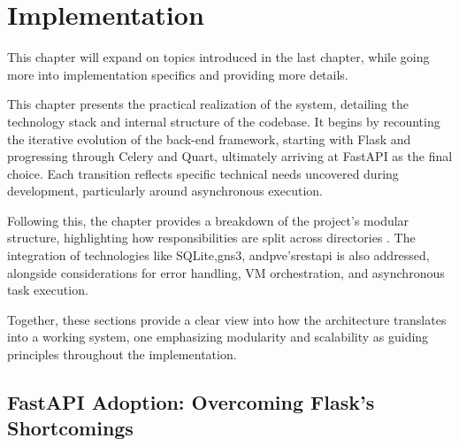 
\chapter{Implementation}


\label{Chapter5Implementation}

This chapter will expand on topics introduced in the last chapter, while going more into implementation specifics 
and providing more details.

This chapter presents the practical realization of the system, detailing the technology stack and internal structure of 
the codebase. It begins by recounting the iterative evolution of the back-end framework, starting with Flask and progressing 
through Celery and Quart, ultimately arriving at FastAPI as the final choice. Each transition reflects specific technical 
needs uncovered during development, particularly around asynchronous execution.

Following this, the chapter provides a breakdown of the project's modular structure, highlighting how responsibilities are split 
across directories . The integration of technologies like SQLite,\ac{gns3}, and\ac{pve}'s\ac{rest}\ac{api} is also addressed, alongside 
considerations for error handling, VM orchestration, and asynchronous task execution.

Together, these sections provide a clear view into how the architecture translates into a working system, one emphasizing 
modularity and scalability as guiding principles throughout the implementation.


\section{FastAPI Adoption: Overcoming Flask's Shortcomings}

